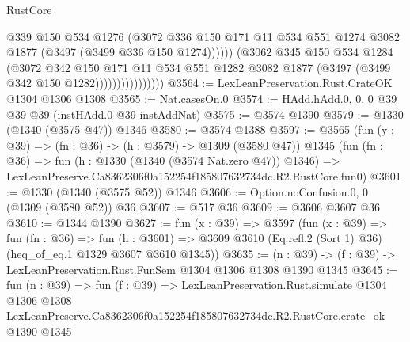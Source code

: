 \begin{lexlean}{RustCore}
\begin{coremodule}
                                  @339
                                  @150
                                  @534
                                  @1276
                                  (@3072
                                    @336
                                    @150
                                    @171
                                    @11
                                    @534
                                    @551
                                    @1274
                                    @3082
                                    @1877
                                    (@3497 (@3499 @336 @150 @1274))))))
                            (@3062
                              @345
                              @150
                              @534
                              @1284
                              (@3072
                                @342
                                @150
                                @171
                                @11
                                @534
                                @551
                                @1282
                                @3082
                                @1877
                                (@3497 (@3499 @342 @150 @1282))))))))))))))))
@3564 := LexLeanPreservation.Rust.CrateOK @1304 @1306 @1308
@3565 := Nat.casesOn.{0}
@3574 := HAdd.hAdd.{0, 0, 0} @39 @39 @39 (instHAdd.{0} @39 instAddNat)
@3575 := @3574 @1390
@3579 := @1330 (@1340 (@3575 @47)) @1346
@3580 := @3574 @1388
@3597 := @3565
    (fun (y : @39) => (fn : @36) -> (h : @3579) -> @1309 (@3580 @47))
    @1345
    (fun (fn : @36) =>
    fun (h : @1330 (@1340 (@3574 Nat.zero @47)) @1346) =>
    LexLeanPreserve.Ca8362306f0a152254f185807632734dc.R2.RustCore.fun0)
@3601 := @1330 (@1340 (@3575 @52)) @1346
@3606 := Option.noConfusion.{0, 0} (@1309 (@3580 @52)) @36
@3607 := @517 @36
@3609 := @3606 @3607 @36
@3610 := @1344 @1390
@3627 := fun (x : @39) =>
  @3597
    (fun (x : @39) =>
    fun (fn : @36) =>
    fun (h : @3601) =>
    @3609 @3610 (Eq.refl.{2} (Sort 1) @36) (heq_of_eq.{1} @1329 @3607 @3610 @1345))
@3635 := (n : @39) -> (f : @39) -> LexLeanPreservation.Rust.FunSem @1304 @1306 @1308 @1390 @1345
@3645 := fun (n : @39) =>
  fun (f : @39) =>
  LexLeanPreservation.Rust.simulate
    @1304
    @1306
    @1308
    LexLeanPreserve.Ca8362306f0a152254f185807632734dc.R2.RustCore.crate_ok
    @1390
    @1345
\end{coremodule}
\end{lexlean}
